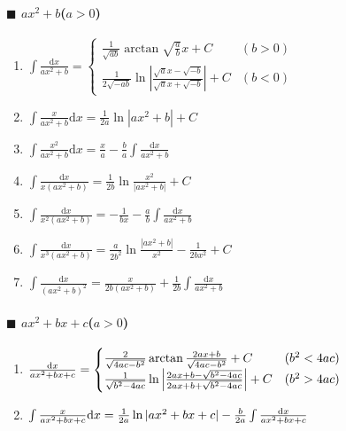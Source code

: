 \paragraph{$\blacksquare$ $ax^2+b$($a>0$)}

\begin{enumerate}

\item $ \int \frac{\mathrm{d}x}{ax^2+b} = \begin{cases}
\frac{1}{\sqrt{ab}} \arctan \sqrt{\frac{a}{b}} x + C & (b > 0) \\
\frac{1}{2\sqrt{-ab}} \ln\left| \frac{\sqrt{a}x-\sqrt{-b}}{\sqrt{a}x+\sqrt{-b}} \right| + C & (b < 0)
\end{cases} $

\item $ \int \frac{x}{ax^2+b} \mathrm{d}x = \frac{1}{2a} \ln \left| ax^2 + b \right| + C $

\item $ \int \frac{x^2}{ax^2+b} \mathrm{d}x = \frac{x}{a} - \frac{b}{a}\int \frac{\mathrm{d}x}{ax^2+b} $

\item $ \int \frac{\mathrm{d}x}{x(ax^2+b)} = \frac{1}{2b} \ln \frac{x^2}{|ax^2+b|} + C $

\item $ \int \frac{\mathrm{d}x}{x^2(ax^2+b)} = -\frac{1}{bx} - \frac{a}{b} \int \frac{\mathrm{d}x}{ax^2+b} $

\item $ \int \frac{\mathrm{d}x}{x^3(ax^2+b)} = \frac{a}{2b^2} \ln \frac{|ax^2+b|}{x^2} - \frac{1}{2bx^2} + C $

\item $ \int \frac{\mathrm{d}x}{(ax^2+b)^2} = \frac{x}{2b(ax^2+b)} + \frac{1}{2b} \int \frac{\mathrm{d}x}{ax^2+b} $

\end{enumerate}

\paragraph{$\blacksquare$ $ax^2+bx+c$($a>0$)}

\begin{enumerate}

\item $ \frac{\mathrm{d} x}{ax^2+bx+c} = \begin{cases}
\frac{2}{\sqrt{4ac-b^2}}\arctan\frac{2ax+b}{\sqrt{4ac-b^2}} + C & (b^2 < 4ac) \\
\frac{1}{\sqrt{b^2-4ac}}\ln\left| \frac{2ax+b-\sqrt{b^2-4ac}}{2ax+b+\sqrt{b^2-4ac}} \right| + C & (b^2 > 4ac)
\end{cases} $

\item $ \int \frac{x}{ax^2+bx+c} \mathrm{d} x = \frac{1}{2a} \ln |ax^2+bx+c| - \frac{b}{2a} \int \frac{\mathrm{d} x}{ax^2+bx+c} $

\end{enumerate}

